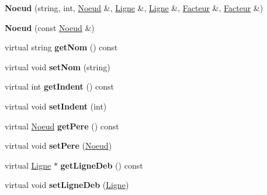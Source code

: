 \begin{DoxyCompactItemize}
\item 
\hypertarget{classNoeud_a3d7033e8004fbdc8c15ac145ecb2dc95}{
{\bfseries Noeud} (string, int, \hyperlink{classNoeud}{Noeud} \&, \hyperlink{classLigne}{Ligne} \&, \hyperlink{classLigne}{Ligne} \&, \hyperlink{classFacteur}{Facteur} \&, \hyperlink{classFacteur}{Facteur} \&)}
\label{classNoeud_a3d7033e8004fbdc8c15ac145ecb2dc95}

\item 
\hypertarget{classNoeud_a6ef8adab9b819f46787eb30a8bae2e77}{
{\bfseries Noeud} (const \hyperlink{classNoeud}{Noeud} \&)}
\label{classNoeud_a6ef8adab9b819f46787eb30a8bae2e77}

\item 
\hypertarget{classNoeud_ac6efbbb2f6ce5260eb741de6ac4a4570}{
virtual string {\bfseries getNom} () const }
\label{classNoeud_ac6efbbb2f6ce5260eb741de6ac4a4570}

\item 
\hypertarget{classNoeud_a784ac2c752bbf779691495bd706c9dff}{
virtual void {\bfseries setNom} (string)}
\label{classNoeud_a784ac2c752bbf779691495bd706c9dff}

\item 
\hypertarget{classNoeud_adf7f2d2851e61f9f6c52656b21b43045}{
virtual int {\bfseries getIndent} () const }
\label{classNoeud_adf7f2d2851e61f9f6c52656b21b43045}

\item 
\hypertarget{classNoeud_a82adba23ed465a551c5e36de00798ad2}{
virtual void {\bfseries setIndent} (int)}
\label{classNoeud_a82adba23ed465a551c5e36de00798ad2}

\item 
\hypertarget{classNoeud_a6dc5943291e782b8831d2acf74f47e05}{
virtual \hyperlink{classNoeud}{Noeud} {\bfseries getPere} () const }
\label{classNoeud_a6dc5943291e782b8831d2acf74f47e05}

\item 
\hypertarget{classNoeud_a14a7046470a71434cbc3fac487fb251d}{
virtual void {\bfseries setPere} (\hyperlink{classNoeud}{Noeud})}
\label{classNoeud_a14a7046470a71434cbc3fac487fb251d}

\item 
\hypertarget{classNoeud_aa8695f78b8fab2cc333fdedec96d1fcd}{
virtual \hyperlink{classLigne}{Ligne} $\ast$ {\bfseries getLigneDeb} () const }
\label{classNoeud_aa8695f78b8fab2cc333fdedec96d1fcd}

\item 
\hypertarget{classNoeud_a3d5ee2169f2464575b8ab07c61863d3b}{
virtual void {\bfseries setLigneDeb} (\hyperlink{classLigne}{Ligne})}
\label{classNoeud_a3d5ee2169f2464575b8ab07c61863d3b}


\end{DoxyCompactItemize}

